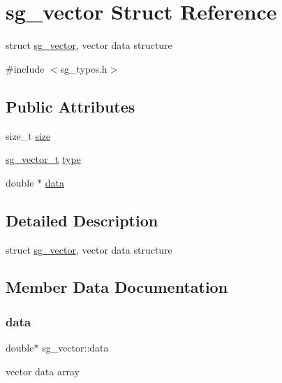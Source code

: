 \hypertarget{structsg__vector}{}\section{sg\+\_\+vector Struct Reference}
\label{structsg__vector}


struct \hyperlink{structsg__vector}{sg\+\_\+vector}, vector data structure  




{\ttfamily \#include $<$sg\+\_\+types.\+h$>$}

\subsection*{Public Attributes}
\begin{DoxyCompactItemize}
\item 
size\+\_\+t \hyperlink{structsg__vector_a13a2c56640c90c5794398e80ad8d3968}{size}
\item 
\hyperlink{sg__types_8h_ab9531c9e57e93e82ac67bd83a8eabe2b}{sg\+\_\+vector\+\_\+t} \hyperlink{structsg__vector_a924808218863b547191bef97bac6f74c}{type}
\item 
double $\ast$ \hyperlink{structsg__vector_ac1f24b8a91925e4f09da921ffa2d8096}{data}
\end{DoxyCompactItemize}


\subsection{Detailed Description}
struct \hyperlink{structsg__vector}{sg\+\_\+vector}, vector data structure 

\subsection{Member Data Documentation}
\hypertarget{structsg__vector_ac1f24b8a91925e4f09da921ffa2d8096}{}\label{structsg__vector_ac1f24b8a91925e4f09da921ffa2d8096} 
\subsubsection{\texorpdfstring{data}{data}}
{\footnotesize\ttfamily double$\ast$ sg\+\_\+vector\+::data}

vector data array \hypertarget{structsg__vector_a13a2c56640c90c5794398e80ad8d3968}{}\label{structsg__vector_a13a2c56640c90c5794398e80ad8d3968} 
